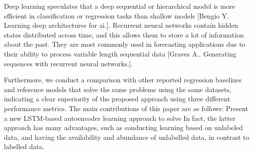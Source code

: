 Deep learning speculates that a deep sequential or hierarchical model is more efficient in classification or regression tasks than shallow models [Bengio Y. Learning deep architectures for ai.]. Recurrent neural networks contain hidden states distributed across time, and this allows them to store a lot of information about the past. They are most commonly used in forecasting applications due to their ability to process variable length sequential data [Graves A.. Generating sequences with recurrent neural networks.].

Furthermore, we conduct a comparison with other reported regression baselines and reference models that solve the same problems using the same datasets, indicating a clear superiority of the proposed approach using three different performance metrics. The main contributions of this paper are as follows:
Present a new LSTM-based autoencoder learning approach to solve
In fact, the latter approach has many advantages, such as conducting learning based on unlabeled data, and having the availability and abundance of unlabelled data, in contrast to labelled data.

\fi

